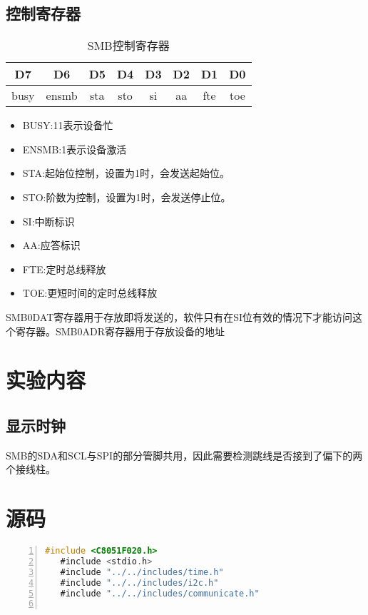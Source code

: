 \documentclass{article}
\newcommand{\ifc}{$I^2C$}
\begin{document}
\begin{CJK}{UTF8}{gkai}
\subsection{控制寄存器}
\begin{table}
  \caption{SMB控制寄存器}
  \label{pro1_2}
  \begin{tabular}{|c|c|c|c|c|c|c|c|}
    \hline
    D7&D6&D5&D4&D3&D2&D1&D0 \\
    \hline
    busy&ensmb&sta&sto&si&aa&fte&toe\\
    \hline
  \end{tabular}
\end{table}
\begin{itemize}
  \item BUSY:11表示设备忙
  \item ENSMB:1表示设备激活
  \item STA:起始位控制，设置为1时，会发送起始位。
  \item STO:阶数为控制，设置为1时，会发送停止位。
  \item SI:中断标识
  \item AA:应答标识
  \item FTE:定时总线释放
  \item TOE:更短时间的定时总线释放
\end{itemize}

SMB0DAT寄存器用于存放即将发送的，软件只有在SI位有效的情况下才能访问这个寄存器。SMB0ADR寄存器用于存放设备的地址
\section{实验内容}
\subsection{显示时钟}
SMB的SDA和SCL与SPI的部分管脚共用，因此需要检测跳线是否接到了偏下的两个接线柱。

\section{源码}

\begin{lstlisting}[language=C,numbers=left,numberstyle=\tiny,%frame=shadowbox,
   rulesepcolor=\color{red!20!green!20!blue!20},
   keywordstyle=\color{blue!70!black},
   commentstyle=\color{blue!90!},
   basicstyle=\ttfamily]
   #include <C8051F020.h>
   #include <stdio.h>
   #include "../../includes/time.h"
   #include "../../includes/i2c.h"
   #include "../../includes/communicate.h"


\end{lstlisting}
\end{CJK}
\end{document}
